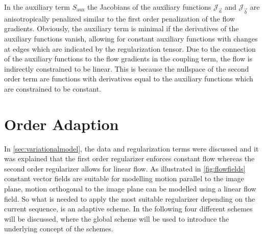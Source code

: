 \documentclass[journal]{vgtc}
\newcommand{\aaux}{\vec{a}}
\newcommand{\baux}{\vec{b}}
\newcommand{\jacob}{\mathcal{J}}
\begin{document}
In the auxiliary term $S_\text{aux}$ the Jacobians of the auxiliary functions $\jacob_{\aaux}$ and $\jacob_{\baux}$ are anisotropically penalized similar to the first order penalization of the flow gradients.
Obviously, the auxiliary term is minimal if the derivatives of the auxiliary functions vanish, allowing for constant auxiliary functions with changes at edges which are indicated by the regularization tensor.
Due to the connection of the auxiliary functions to the flow gradients in the coupling term, the flow is indirectly constrained to be linear.
This is because the nullspace of the second order term are functions with derivatives equal to the auxiliary functions which are constrained to be constant.

\section{Order Adaption}
In \cref{sec:variationalmodel}, the data and regularization terms were discussed and it was explained that the first order regularizer enforces constant flow whereas the second order regularizer allows for linear flow.
As illustrated in \cref{fig:flowfields} constant vector fields are suitable for modelling motion parallel to the image plane, motion orthogonal to the image plane can be modelled using a linear flow field.
So what is needed to apply the most suitable regularizer depending on the current sequence, is an adaptive scheme.
In the following four different schemes will be discussed, where the global scheme will be used to introduce the underlying concept of the schemes.
\end{document}
